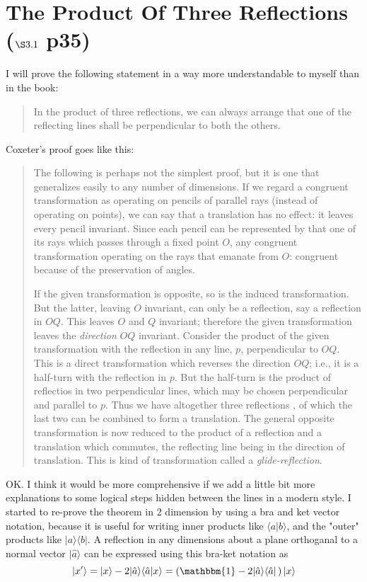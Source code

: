 \documentclass{article}
\begin{document}
\section{The Product Of Three Reflections ($\S\text{3.1}$ p35)}
\label{sec-3}
I will prove the following statement in a way more understandable to myself than in the book:
\begin{quote}
In the product of three reflections, we can always arrange that one of the reflecting lines shall be perpendicular to both the others.
\end{quote}
Coxeter's proof goes like this:
\begin{quote}
The following is perhaps not the simplest proof, but it is one that generalizes easily to any number of dimensions.
 If we regard a congruent transformation as operating on pencils of parallel rays (instead of operating on points), we can say that a translation has no effect: it leaves every pencil invariant.
 Since each pencil can be represented by that one of its rays which passes through a fixed point $O$,
 any congruent transformation operating on the rays that emanate from $O$: congruent because of the preservation of angles.

If the given transformation is opposite, so is the induced transformation.
 But the latter, leaving $O$ invariant, can only be a reflection, say a reflection in $OQ$.
 This leaves  $O$ and $Q$ invariant; therefore the given transformation leaves the \emph{direction} $OQ$ invariant.
 Consider the product of the given transformation with the reflection in any line, $p$, perpendicular to $OQ$.
 This is a direct transformation which reverses the direction $OQ$; i.e., it is a half-turn with the reflection in $p$.
 But the half-turn is the product of reflectios in two perpendicular lines, which may be chosen perpendicular and parallel to $p$.
 Thus we have altogether three reflections , of which the last two can be combined to form a translation.
 The general opposite transformation is now reduced to the product of a reflection and a translation which commutes, the reflecting line being in the direction of translation.
 This is kind of transformation called  a \emph{glide-reflection}.
\end{quote}
OK. I think it would be more comprehensive if we add a little bit more explanations to some logical steps hidden between the lines in a modern style. 
I started to re-prove the theorem in 2 dimension by using a bra and ket vector notation, because it is useful for writing inner products like $\langle a|b \rangle$, 
and the "outer" products like $|a \rangle \langle b|$. A reflection in any dimensions about a plane orthoganal to a normal vector $|\hat{a}\rangle$ can be expressed using this bra-ket notation as
\begin{equation}
|x' \rangle = |x \rangle - 2 |\hat{a} \rangle \langle \hat{a} |x \rangle = \left( \mathbbm{1} - 2 |\hat{a} \rangle \langle \hat{a}  |\, \right) |x \rangle
\end{equation}
\end{document}
